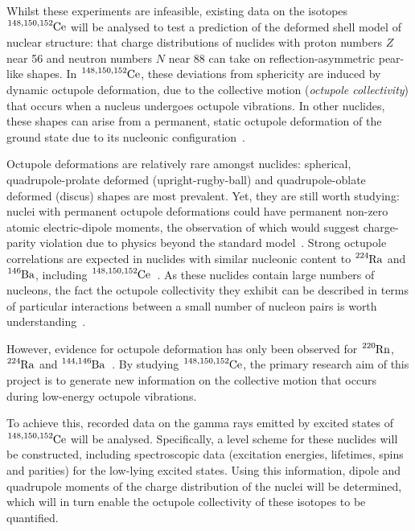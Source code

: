 \documentclass[12pt,a4paper]{article}
\begin{document}
\medskip
\noindent
Whilst these experiments are infeasible, existing data on the isotopes $\ce{^{148,150,152}Ce}$ will be analysed to test a prediction of the deformed shell model of nuclear structure: that charge distributions of nuclides with proton numbers $Z$ near 56 and neutron numbers $N$ near 88 can take on reflection-asymmetric pear-like shapes.
In $\ce{^{148,150,152}Ce}$, these deviations from sphericity are induced by dynamic octupole deformation, due to the collective motion (\textit{octupole collectivity}) that occurs when a nucleus undergoes octupole vibrations.
In other nuclides, these shapes can arise from a permanent, static octupole deformation of the ground state due to its nucleonic configuration~\cite{butler_intrinsic_1996}.


\medskip
\noindent
Octupole deformations are relatively rare amongst nuclides: spherical, quadrupole-prolate deformed (upright-rugby-ball) and quadrupole-oblate deformed (discus) shapes are most prevalent.
Yet, they are still worth studying: nuclei with permanent octupole deformations could have permanent non-zero atomic electric-dipole moments, the observation of which would suggest charge-parity violation due to physics beyond the standard model~\cite{gaffney_studies_2013}.
Strong octupole correlations are expected in nuclides with similar nucleonic content to $\ce{^{224}Ra}$ and $\ce{^{146}Ba}$, including $\ce{^{148,150,152}Ce}$~\cite{bucher_direct_2017}.
As these nuclides contain large numbers of nucleons, the fact the octupole collectivity they exhibit can be described in terms of particular interactions between a small number of nucleon pairs is worth understanding~\cite{casten_nuclear_1990}.

\medskip
\noindent
However, evidence for octupole deformation has only been observed for $\ce{^{220}Rn}$, $\ce{^{224}Ra}$ and $\ce{^{144,146}Ba}$~\cite{bucher_direct_2017,bucher_direct_2016}.
By studying $\ce{^{148,150,152}Ce}$, the primary research aim of this project is to generate new information on the collective motion that occurs during low-energy octupole vibrations.

\medskip
\noindent
To achieve this, recorded data on the gamma rays emitted by excited states of $\ce{^{148,150,152}Ce}$ will be analysed.
Specifically, a level scheme for these nuclides will be constructed, including spectroscopic data (excitation energies, lifetimes, spins and parities) for the low-lying excited states.
Using this information, dipole and quadrupole moments of the charge distribution of the nuclei will be determined, which will in turn enable the octupole collectivity of these isotopes to be quantified.
\end{document}

